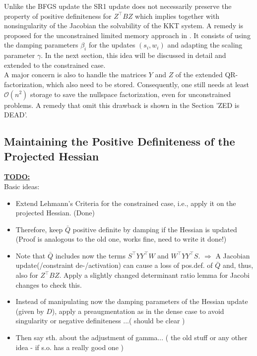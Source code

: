 \documentclass{svmult}
\begin{document}
\noindent Unlike the BFGS update the SR1 update does not necessarily preserve the property of positive definiteness for $Z^\top B Z$ which implies together with nonsingularity of the Jacobian the solvability of the KKT system. A remedy is proposed for the unconstrained limited memory approach in \cite{tb:VOLKER}. It consists of using the damping parameters $\beta_i$ for the updates $(s_i,w_i)$  and adapting the scaling parameter $\gamma$.
In the next section, this idea will be discussed in detail and extended to the constrained case.\\

\noindent A major concern is also to handle the matrices $Y$ and $Z$ of the extended QR-factorization, which also need to be stored. Consequently, one still needs at least $\mathcal{O}(n^2)$ storage to save the nullspace factorization, even for unconstrained problems. A remedy that omit this drawback is shown in the Section 'ZED is DEAD'.




\clearpage
\subsection{Maintaining the Positive Definiteness of the Projected Hessian}

\underline{\textbf{TODO:}} \\
Basic ideas:
\begin{itemize}
	\item Extend Lehmann's Criteria for the constrained case, i.e., apply it on the projected Hessian. (Done)
	\item Therefore, keep $\bar{Q}$ positive definite by damping if the Hessian is updated (Proof is analogous to the old one, works fine, need to write it done!)
	\item Note that $\bar{Q}$ includes now the terms $S^{\top}YY^{\top}W$ and $W^{\top}YY^{\top}S$.
		$\Rightarrow$ A Jacobian update(/constraint de-/activation) can cause a loss of pos.def. of $\bar{Q}$ and, thus, also for $Z^{\top}BZ$.
		 Apply a slightly changed determinant ratio lemma for Jacobi changes to check this.
	\item Instead of manipulating now the damping parameters of the Hessian update (given by $D$),
		apply a preaugmentation as in the dense case to avoid singularity or negative definiteness ...( should be clear )
	\item Then say sth. about the adjustment of gamma... ( the old stuff or any other idea - if s.o. has a really good one )
\end{itemize}
 
\end{document}
